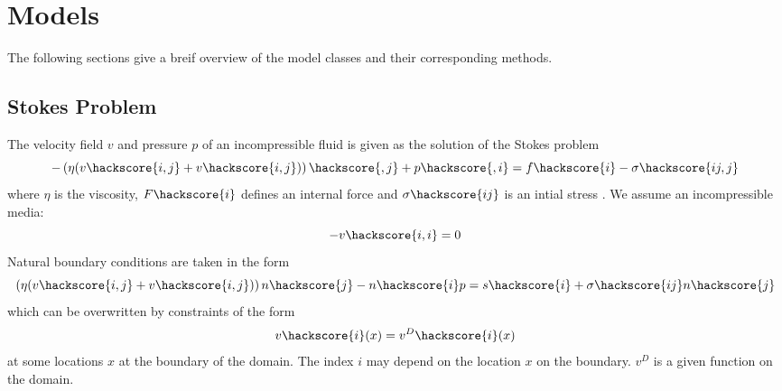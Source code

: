 
%
%
%


\chapter{Models}
\label{MODELS CHAPTER}

The following sections give a breif overview of the model classes and their corresponding methods.

\section{Stokes Problem}
The velocity  field $v$ and pressure $p$ of an incompressible fluid  is given as the solution of the Stokes problem
\begin{equation}\label{Stokes 1}
-\left(\eta(v\hackscore{i,j}+ v\hackscore{i,j})\right)\hackscore{,j}+p\hackscore{,i}=f\hackscore{i}-\sigma\hackscore{ij,j}
\end{equation}
where $\eta$ is the viscosity, $F\hackscore{i}$ defines an internal force  and $\sigma\hackscore{ij}$ is an intial stress . We assume an incompressible media:
\begin{equation}\label{Stokes 2}
-v\hackscore{i,i}=0
\end{equation}
Natural boundary conditions are taken in the form 
\begin{equation}\label{Stokes Boundary}
\left(\eta(v\hackscore{i,j}+ v\hackscore{i,j})\right)n\hackscore{j}-n\hackscore{i}p=s\hackscore{i}+\sigma\hackscore{ij} n\hackscore{j}
\end{equation}
which can be overwritten by constraints of the form 
\begin{equation}\label{Stokes Boundary0}
v\hackscore{i}(x)=v^D\hackscore{i}(x)
\end{equation}
at some locations $x$ at the boundary of the domain. The index $i$ may depend on the location $x$ on the boundary.
$v^D$ is a given function on the domain.

